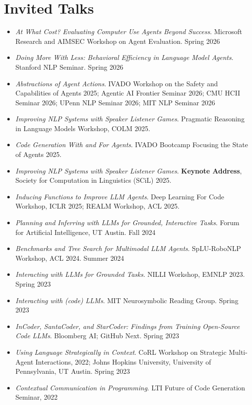 \section{Invited Talks}
\begin{itemize}[leftmargin=-0.4mm,partopsep=0pt,label=]
\item \emph{At What Cost? Evaluating Computer Use Agents Beyond Success}. Microsoft Research and AIMSEC Workshop on Agent Evaluation. Spring 2026
\item \emph{Doing More With Less: Behavioral Efficiency in Language Model Agents}. Stanford NLP Seminar. Spring 2026
\item \emph{Abstractions of Agent Actions}. IVADO Workshop on the Safety and Capabilities of Agents 2025; Agentic AI Frontier Seminar 2026; CMU HCII Seminar 2026; UPenn NLP Seminar 2026; MIT NLP Seminar 2026
\item \emph{Improving NLP Systems with Speaker Listener Games}.  Pragmatic Reasoning in Language Models Workshop, COLM 2025.
\item \emph{Code Generation With and For Agents}. IVADO Bootcamp Focusing the State of Agents 2025.
\item \emph{Improving NLP Systems with Speaker Listener Games}. \textbf{Keynote Address}, Society for Computation in Linguistics (SCiL) 2025.
\item \emph{Inducing Functions to Improve LLM Agents}. Deep Learning For Code Workshop, ICLR 2025; REALM Workshop, ACL 2025.
\item \emph{Planning and Inferring with LLMs for Grounded, Interactive Tasks}. Forum for Artificial Intelligence, UT Austin. Fall 2024
\item \emph{Benchmarks and Tree Search for Multimodal LLM Agents}. SpLU-RoboNLP Workshop, ACL 2024. Summer 2024
\item \emph{Interacting with LLMs for Grounded Tasks}. NILLI Workshop, EMNLP 2023. Spring 2023
\item \emph{Interacting with (code) LLMs}. MIT Neurosymbolic Reading Group. Spring 2023
\item \emph{InCoder, SantaCoder, and StarCoder: Findings from Training Open-Source Code LLMs}. Bloomberg AI; GitHub Next. Spring 2023
\item \emph{Using Language Strategically in Context}. CoRL Workshop on Strategic Multi-Agent Interactions, 2022; Johns Hopkins University, University of Pennsylvania, UT Austin. Spring 2023
\item \emph{Contextual Communication in Programming}. LTI Future of Code Generation Seminar, 2022

\end{itemize}
